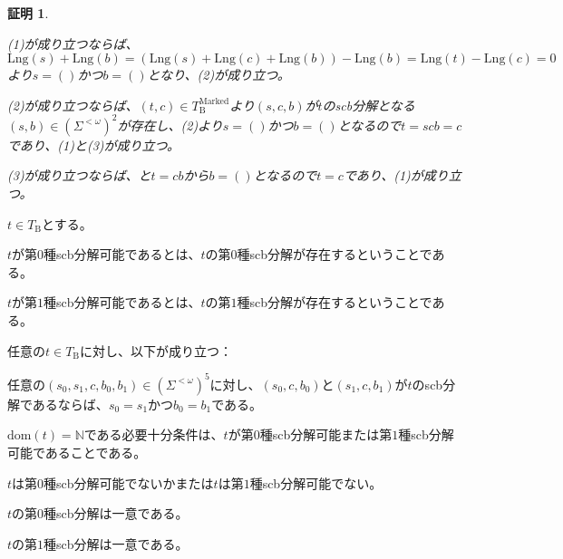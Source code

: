 \documentclass[dvipdfmx,uplatex]{jsarticle}
\theoremstyle{customnonumberbreakfortheorem}
\theoremstyle{customnonumberbreakforproof}
\newtheorem{hideableproof}{証明}
\begin{document}
\begin{hideableproof}
	\begin{indented}
		\item (1)が成り立つならば、\(\textrm{Lng}(s) + \textrm{Lng}(b) = (\textrm{Lng}(s) + \textrm{Lng}(c) + \textrm{Lng}(b)) - \textrm{Lng}(b) = \textrm{Lng}(t) - \textrm{Lng}(c) = 0\)より\(s = ()\)かつ\(b = ()\)となり、(2)が成り立つ。
		\item (2)が成り立つならば、\((t,c) \in T_{\textrm{B}}^{\textrm{Marked}}\)より\((s,c,b)\)が\(t\)のscb分解となる\((s,b) \in (\Sigma^{< \omega})^2\)が存在し、(2)より\(s = ()\)かつ\(b = ()\)となるので\(t = scb = c\)であり、(1)と(3)が成り立つ。
		\item (3)が成り立つならば、と\(t = cb\)から\(b = ()\)となるので\(t = c\)であり、(1)が成り立つ。
	\end{indented}
\end{hideableproof}

\(t \in T_{\textrm{B}}\)とする。
\begin{nenumerate}
	\item \(t\)が第\(0\)種scb分解可能であるとは、\(t\)の第\(0\)種scb分解が存在するということである。
	\item \(t\)が第\(1\)種scb分解可能であるとは、\(t\)の第\(1\)種scb分解が存在するということである。
\end{nenumerate}

\begin{proposition}[scb分解の一意性]\label{scb分解の一意性}
	任意の\(t \in T_{\textrm{B}}\)に対し、以下が成り立つ：
	\begin{penumerate}
		\item 任意の\((s_0,s_1,c,b_0,b_1) \in (\Sigma^{< \omega})^5\)に対し、\((s_0,c,b_0)\)と\((s_1,c,b_1)\)が\(t\)のscb分解であるならば、\(s_0 = s_1\)かつ\(b_0 = b_1\)である。
		\item \(\textrm{dom}(t) = \mathbb{N}\)である必要十分条件は、\(t\)が第\(0\)種scb分解可能または第\(1\)種scb分解可能であることである。
		\item \(t\)は第\(0\)種scb分解可能でないかまたは\(t\)は第\(1\)種scb分解可能でない。
		\item \(t\)の第\(0\)種scb分解は一意である。
		\item \(t\)の第\(1\)種scb分解は一意である。
	\end{penumerate}
\end{proposition}
\end{document}
